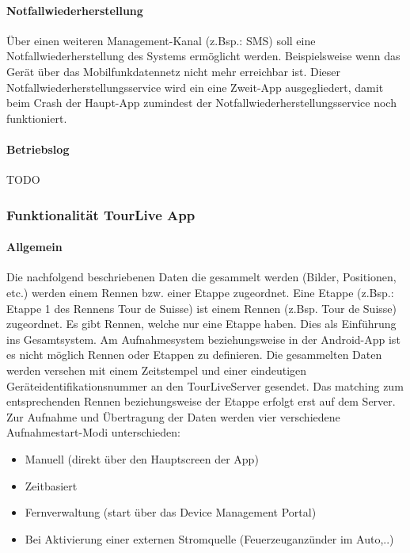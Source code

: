 \paragraph{Notfallwiederherstellung}
Über einen weiteren Management-Kanal (z.Bsp.: SMS) soll eine Notfallwiederherstellung des Systems ermöglicht werden. Beispielsweise wenn das Gerät über das Mobilfunkdatennetz nicht mehr erreichbar ist. Dieser Notfallwiederherstellungsservice wird ein eine Zweit-App ausgegliedert, damit beim Crash der Haupt-App zumindest der Notfallwiederherstellungsservice noch funktioniert.
\paragraph{Betriebslog}
TODO
\subsubsection{Funktionalität TourLive App}
\paragraph{Allgemein}
Die nachfolgend beschriebenen Daten die gesammelt werden (Bilder, Positionen, etc.) werden einem Rennen bzw. einer Etappe zugeordnet. Eine Etappe (z.Bsp.: Etappe 1 des Rennens Tour de Suisse) ist einem Rennen (z.Bsp. Tour de Suisse) zugeordnet. Es gibt Rennen, welche nur eine Etappe haben. Dies als Einführung ins Gesamtsystem. Am Aufnahmesystem beziehungsweise in der Android-App ist es nicht möglich Rennen oder Etappen zu definieren. Die gesammelten Daten werden versehen mit einem Zeitstempel und einer eindeutigen Geräteidentifikationsnummer an den TourLiveServer gesendet. Das matching zum entsprechenden Rennen beziehungsweise der Etappe erfolgt erst auf dem Server. \\

Zur Aufnahme  und Übertragung der Daten werden vier verschiedene Aufnahmestart-Modi unterschieden:
\begin{itemize}
	\item Manuell (direkt über den Hauptscreen der App)
	\item Zeitbasiert
	\item Fernverwaltung (start über das Device Management Portal)
	\item Bei Aktivierung einer externen Stromquelle (Feuerzeuganzünder im Auto,..)
\end{itemize}

